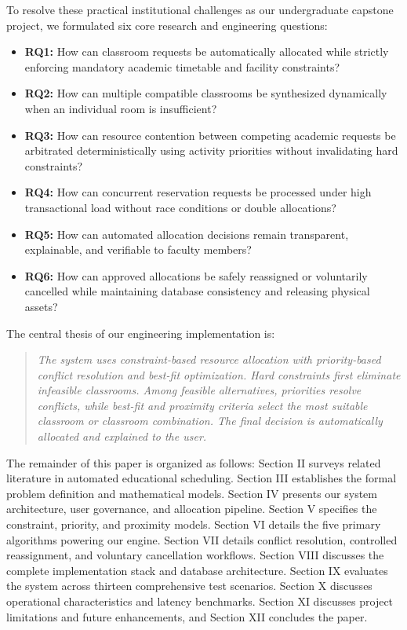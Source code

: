 \documentclass[conference]{IEEEtran}
\begin{document}
To resolve these practical institutional challenges as our undergraduate capstone project, we formulated six core research and engineering questions:
\begin{itemize}
    \item \textbf{RQ1:} How can classroom requests be automatically allocated while strictly enforcing mandatory academic timetable and facility constraints?
    \item \textbf{RQ2:} How can multiple compatible classrooms be synthesized dynamically when an individual room is insufficient?
    \item \textbf{RQ3:} How can resource contention between competing academic requests be arbitrated deterministically using activity priorities without invalidating hard constraints?
    \item \textbf{RQ4:} How can concurrent reservation requests be processed under high transactional load without race conditions or double allocations?
    \item \textbf{RQ5:} How can automated allocation decisions remain transparent, explainable, and verifiable to faculty members?
    \item \textbf{RQ6:} How can approved allocations be safely reassigned or voluntarily cancelled while maintaining database consistency and releasing physical assets?
\end{itemize}

The central thesis of our engineering implementation is:
\begin{quote}
\textit{The system uses constraint-based resource allocation with priority-based conflict resolution and best-fit optimization. Hard constraints first eliminate infeasible classrooms. Among feasible alternatives, priorities resolve conflicts, while best-fit and proximity criteria select the most suitable classroom or classroom combination. The final decision is automatically allocated and explained to the user.}
\end{quote}

The remainder of this paper is organized as follows: Section II surveys related literature in automated educational scheduling. Section III establishes the formal problem definition and mathematical models. Section IV presents our system architecture, user governance, and allocation pipeline. Section V specifies the constraint, priority, and proximity models. Section VI details the five primary algorithms powering our engine. Section VII details conflict resolution, controlled reassignment, and voluntary cancellation workflows. Section VIII discusses the complete implementation stack and database architecture. Section IX evaluates the system across thirteen comprehensive test scenarios. Section X discusses operational characteristics and latency benchmarks. Section XI discusses project limitations and future enhancements, and Section XII concludes the paper.
\end{document}
